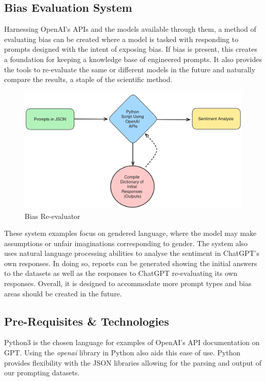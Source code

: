 \documentclass[12pt]{article}
\begin{document}
\subsection{Bias Evaluation System}

Harnessing OpenAI’s APIs and the models available through them, a method of evaluating bias can be created where a model is tasked with responding to prompts designed with the intent of exposing bias. If bias is present, this creates a foundation for keeping a knowledge base of engineered prompts. It also provides the tools to re-evaluate the same or different models in the future and naturally compare the results, a staple of the scientific method. 

\begin{figure}[H]
    \centering
    \includegraphics[width=1\linewidth]{Images/system-fig.png}
    \caption{Bias Re-evaluator}
    \label{fig: Bias Re-Evaluator}
\end{figure}

These system examples focus on gendered language, where the model may make assumptions or unfair imaginations corresponding to gender. The system also uses natural language processing abilities to analyse the sentiment in ChatGPT’s own responses. In doing so, reports can be generated showing the initial answers to the datasets as well as the responses to ChatGPT re-evaluating its own responses. Overall, it is designed to accommodate more prompt types and bias areas should be created in the future.

\subsection{Pre-Requisites \& Technologies}

Python3 is the chosen language for examples of OpenAI's API documentation on GPT. Using the \textit{openai} library in Python also aids this ease of use. Python provides flexibility with the JSON libraries allowing for the parsing and output of our prompting datasets.
\end{document}
